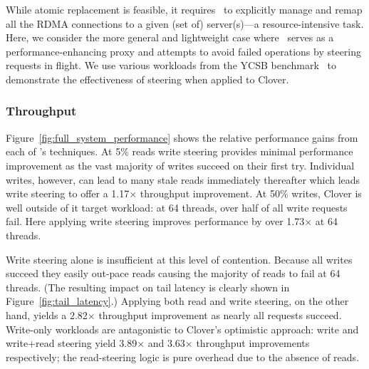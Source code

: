 While atomic replacement is feasible, it requires \sword\ to
explicitly manage and remap all the RDMA connections to a given (set
of) server(s)---a resource-intensive task.  Here, we consider the more
general and lightweight case where \sword\ serves as a
performance-enhancing proxy and attempts to avoid failed operations by
steering requests in flight.  We use various workloads from the YCSB
benchmark~\cite{ycsb} to demonstrate the effectiveness of steering
when applied to Clover.

\subsubsection{Throughput}

Figure~\ref{fig:full_system_performance} shows the relative
performance gains from each of \sword's techniques. At 5\% reads write
steering provides minimal performance improvement as the vast majority
of writes succeed on their first try. Individual writes, however, can
lead to many stale reads immediately thereafter which leads write steering
to offer a 1.17$\times$ throughput improvement.
%
%
At 50\% writes, Clover is well outside of it target workload:
at 64 threads, over half of all write requests fail. Here applying write
steering improves performance by over 1.73$\times$ at 64 threads.

Write steering alone is insufficient at this level of contention.
Because all writes succeed they easily out-pace reads causing the
majority of reads to fail at 64 threads.  (The resulting impact on
tail latency is clearly shown in Figure~\ref{fig:tail_latency}.)
Applying both read and write steering, on the other hand, yields a
2.82$\times$ throughput improvement as nearly all requests succeed.
%
%
Write-only workloads are antagonistic to Clover's optimistic
approach: write and write+read steering yield 3.89$\times$ and
3.63$\times$ throughput improvements respectively; the read-steering
logic is pure overhead due to the absence of reads.



